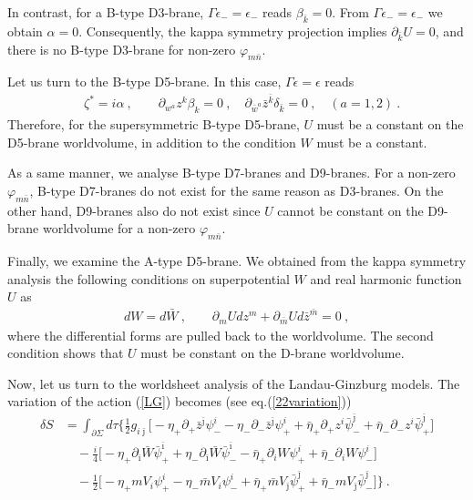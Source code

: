 \documentclass[a4paper,12pt]{article}
\numberwithin{equation}{section}
\newcommand{\del}{\partial}
\newcommand{\ib}{\bar{\imath}}
\newcommand{\jb}{\bar{\jmath}}
\newcommand{\kb}{\bar{k}}
\newcommand{\mb}{\bar{m}}
\newcommand{\nb}{\bar{n}}
\newcommand{\wb}{\bar{w}}
\newcommand{\zb}{\bar{z}}
\newcommand{\vp}{\varphi}
\newcommand{\nn}{\nonumber\\}
\newcommand{\psb}{\bar{\psi}}
\newcommand{\etb}{\bar{\eta}}
\newcommand{\Wb}{\bar{W}}
\newcommand{\pha}{z}
\newcommand{\phb}{\bar{z}}
\begin{document}
In contrast, for a B-type D3-brane, $\Gamma \epsilon_{-}=\epsilon_{-}$ reads
$\beta_{\kb}=0$. From $\Gamma \epsilon_{-}=\epsilon_{-}$ we obtain
$\alpha=0$. 
Consequently, the kappa symmetry projection implies $\del_{\kb}U=0$,
and there is no B-type D3-brane for non-zero $\vp_{m\nb}$.

Let us turn to the B-type D5-brane. In this case,
$\Gamma \epsilon=\epsilon$ reads 
\begin{align}
 &\zeta^{*}=i\alpha~,\qquad \del_{w^{a}}z^{k}\beta_{k}=0~,\quad 
 \del_{\wb^{a}}\zb^{\kb}\delta_{\kb}=0~,\quad (a=1,2)~.
\end{align}
Therefore, for the supersymmetric B-type D5-brane, $U$ must be a constant on
the D5-brane worldvolume, in addition to the condition $W$ must be a
constant.

As a same manner, we analyse B-type D7-branes and D9-branes.
For a non-zero $\vp_{m\nb}$, B-type D7-branes do not exist for the same reason
as D3-branes. On the other hand,
 D9-branes also do not exist since $U$ cannot be constant
on the D9-brane worldvolume for a non-zero $\vp_{m\nb}$.

Finally, we examine the A-type D5-brane. We obtained from the kappa symmetry
analysis the following conditions on superpotential $W$ and real
harmonic function $U$ as
\begin{align}
 dW=d\Wb~,\qquad \del_{m}Udz^{m}+ \del_{\mb}U d\zb^{\mb}=0~,
\end{align}
where the differential forms are pulled back to the worldvolume.
The second condition shows that $U$ must be constant on the
D-brane worldvolume.

Now, let us turn to the worldsheet analysis of the Landau-Ginzburg
models. The variation of the action (\ref{LG}) becomes (see
eq.(\ref{22variation})) 
\begin{align}
 \delta S &= \int_{\del \Sigma}d\tau\Bigg\{
\frac12 g_{i\jb}\Big[
  -\eta_{+}\del_{+}\phb^{\jb}\psi^{i}_{-}
  -\eta_{-}\del_{-}\phb^{\jb}\psi^{i}_{+}
  +\etb_{+}\del_{+}\pha^{i}\psb^{\jb}_{-}
  +\etb_{-}\del_{-}\pha^{i}\psb^{\jb}_{+}
  \Big]\nn
 &\quad -\frac{i}{4}\Big[
     -\eta_{+}\del_{\ib}\Wb\psb^{\ib}_{+}
     +\eta_{-}\del_{\ib}\Wb\psb^{\ib}_{-}
     -\etb_{+}\del_{ i } W \psi^{ i }_{+}
     +\etb_{-}\del_{ i } W \psi^{ i }_{-}
    \Big]\nn
 &\quad -\frac12\Big[
 -\eta_{+} m  V_{ i }\psi^{ i }_{+}
 -\eta_{-}\mb V_{ i }\psi^{ i }_{-}
 +\etb_{+}\mb V_{\jb}\psb^{\jb}_{+}
 +\etb_{-} m  V_{\jb}\psb^{\jb}_{-}
   \Big] \Bigg\} ~.
 \label{22variation-boundary}
\end{align}
\end{document}
